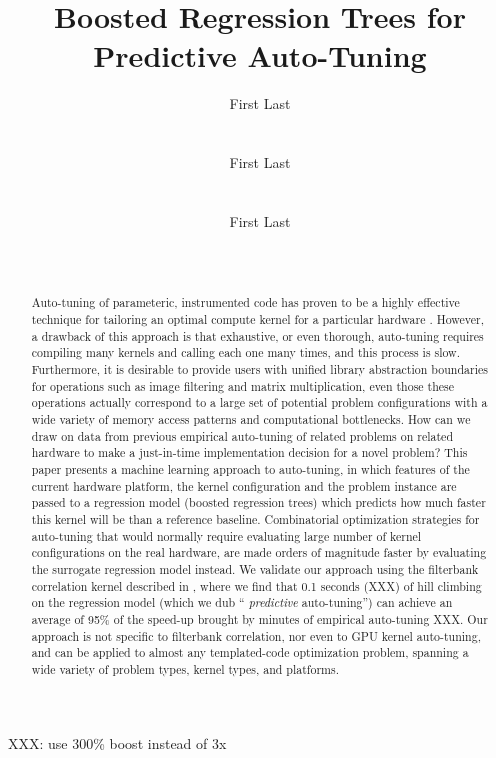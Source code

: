 \documentclass{sig-alternate}
\title{Boosted Regression Trees for Predictive Auto-Tuning}
\author{
\alignauthor First Last\\
\affaddr{Affiliation line 1}\\
\affaddr{Affiliation line 2}\\
\email{anon@mail.com}
\alignauthor First Last\\
\affaddr{Affiliation line 1}\\
\affaddr{Affiliation line 2}\\
\email{anon@mail.com}
\alignauthor First Last\\
\affaddr{Affiliation line 1}\\
\affaddr{Affiliation line 2}\\
\email{anon@mail.com}
}
\begin{document}
\maketitle

\begin{abstract}

Auto-tuning of parameteric, instrumented code has proven to be a highly
effective technique for tailoring an optimal compute kernel for a particular
hardware \cite{XXX}.
However, a drawback of this approach is that exhaustive, or even thorough,
auto-tuning requires compiling many kernels and calling each one many times,
and this process is slow.  Furthermore, it is desirable to provide users
with unified library abstraction boundaries for operations such as image
filtering and matrix multiplication, even those these operations actually
correspond to a large set of potential problem configurations with a wide
variety of memory access patterns and computational bottlenecks.  How can we
draw on data from previous empirical auto-tuning of related problems on related
hardware to make a just-in-time implementation decision for a novel problem?
This paper presents a machine learning approach to auto-tuning, in which
features of the current hardware platform, the kernel configuration and the
problem instance are passed to a regression model (boosted regression trees)
which predicts how much faster this kernel will be than a reference
baseline.  Combinatorial optimization strategies for auto-tuning that would
normally require evaluating large number of kernel configurations on the real
hardware, are made orders of magnitude faster by evaluating the surrogate
regression model instead.  We validate our approach using the filterbank
correlation kernel described in \citet{pinto+cox:2011gcg}, where we find that
0.1 seconds (XXX) of hill climbing on the regression model (which we dub ``{\em
predictive} auto-tuning'') can achieve an average of 95\% of the
speed-up brought by minutes of empirical auto-tuning XXX.  Our approach is not
specific to filterbank correlation, nor even to GPU kernel auto-tuning, and can
be applied to almost any templated-code optimization problem, spanning a wide
variety of problem types, kernel types, and platforms.

\end{abstract}

XXX: use 300\% boost instead of 3x

\end{document}
